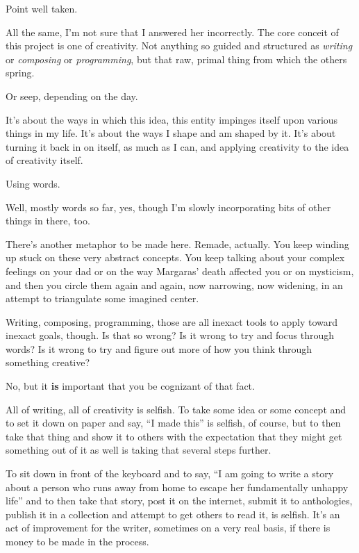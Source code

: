 \begin{ally}
Point well taken.
\end{ally}
All the same, I'm not sure that I answered her incorrectly. The core conceit of this project is one of creativity. Not anything so guided and structured as \emph{writing} or \emph{composing} or \emph{programming}, but that raw, primal thing from which the others spring.

\begin{ally}
Or seep, depending on the day.
\end{ally}
It's about the ways in which this idea, this entity impinges itself upon various things in my life. It's about the ways I shape and am shaped by it. It's about turning it back in on itself, as much as I can, and applying creativity to the idea of creativity itself.

\begin{ally}
Using words.
\end{ally}
Well, mostly words so far, yes, though I'm slowly incorporating bits of other things in there, too.

\begin{ally}
There's another metaphor to be made here. Remade, actually. You keep winding up stuck on these very abstract concepts. You keep talking about your complex feelings on your dad or on the way Margaras' death affected you or on mysticism, and then you circle them again and again, now narrowing, now widening, in an attempt to triangulate some imagined center.
\end{ally}
Writing, composing, programming, those are all inexact tools to apply toward inexact goals, though. Is that so wrong? Is it wrong to try and focus through words? Is it wrong to try and figure out more of how you think through something creative?

\begin{ally}
No, but it \textbf{is} important that you be cognizant of that fact.
\end{ally}
\newpage

\noindent All of writing, all of creativity is selfish. To take some idea or some concept and to set it down on paper and say, ``I made this'' is selfish, of course, but to then take that thing and show it to others with the expectation that they might get something out of it as well is taking that several steps further.

To sit down in front of the keyboard and to say, ``I am going to write a story about a person who runs away from home to escape her fundamentally unhappy life'' and to then take that story, post it on the internet, submit it to anthologies, publish it in a collection and attempt to get others to read it, is selfish. It's an act of improvement for the writer, sometimes on a very real basis, if there is money to be made in the process.

